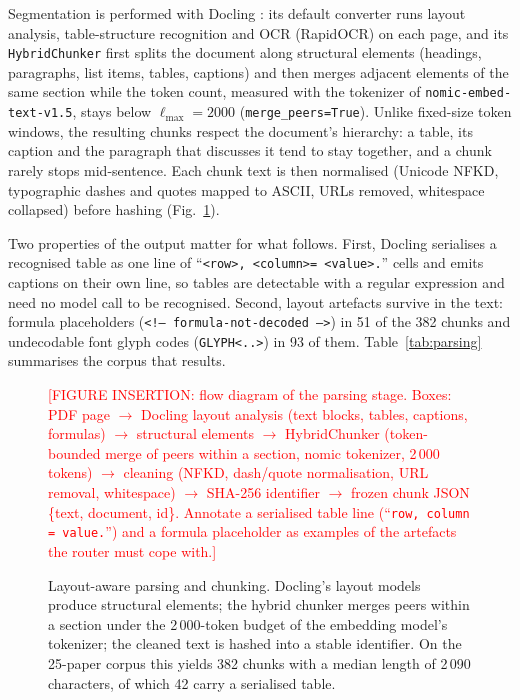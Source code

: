 \documentclass[pdflatex,sn-mathphys-num]{sn-jnl}
\newcommand{\todo}[1]{\textcolor{red}{#1}}
\theoremstyle{thmstyleone}%
\theoremstyle{thmstylethree}%
\begin{document}
Segmentation is performed with Docling \cite{auer2024doclingtechnicalreport,livathinos2025doclinglayoutanalysis}: its default converter runs layout analysis, table-structure recognition and OCR (RapidOCR) on each page, and its \texttt{HybridChunker} \cite{docling2024chunkingdocumentation} first splits the document along structural elements (headings, paragraphs, list items, tables, captions) and then merges adjacent elements of the same section while the token count, measured with the tokenizer of \texttt{nomic-embed-text-v1.5}, stays below $\ell_{\max}=2000$ (\texttt{merge\_peers=True}). Unlike fixed-size token windows, the resulting chunks respect the document's hierarchy: a table, its caption and the paragraph that discusses it tend to stay together, and a chunk rarely stops mid-sentence. Each chunk text is then normalised (Unicode NFKD, typographic dashes and quotes mapped to ASCII, URLs removed, whitespace collapsed) before hashing (Fig.~\ref{fig:docling}).

Two properties of the output matter for what follows. First, Docling serialises a recognised table as one line of ``\texttt{\textless row\textgreater, \textless column\textgreater = \textless value\textgreater.}'' cells and emits captions on their own line, so tables are detectable with a regular expression and need no model call to be recognised. Second, layout artefacts survive in the text: formula placeholders (\texttt{\textless!-- formula-not-decoded --\textgreater}) in 51 of the 382 chunks and undecodable font glyph codes (\texttt{GLYPH\textless..\textgreater}) in 93 of them. Table~\ref{tab:parsing} summarises the corpus that results.

\begin{figure}[htbp]
  \centering
  \todo{[FIGURE INSERTION: flow diagram of the parsing stage. Boxes: PDF page $\rightarrow$ Docling layout analysis (text blocks, tables, captions, formulas) $\rightarrow$ structural elements $\rightarrow$ HybridChunker (token-bounded merge of peers within a section, nomic tokenizer, 2\,000 tokens) $\rightarrow$ cleaning (NFKD, dash/quote normalisation, URL removal, whitespace) $\rightarrow$ SHA-256 identifier $\rightarrow$ frozen chunk JSON \{text, document, id\}. Annotate a serialised table line (``\texttt{row, column = value.}'') and a formula placeholder as examples of the artefacts the router must cope with.]}
  \caption{Layout-aware parsing and chunking. Docling's layout models produce structural elements; the hybrid chunker merges peers within a section under the 2\,000-token budget of the embedding model's tokenizer; the cleaned text is hashed into a stable identifier. On the 25-paper corpus this yields 382 chunks with a median length of 2\,090 characters, of which 42 carry a serialised table.}
  \label{fig:docling}
\end{figure}
\end{document}

